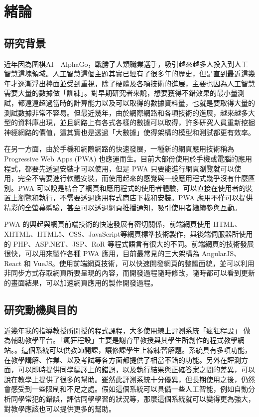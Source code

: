 \chapter{緒論}
\section{研究背景} 

近年因為圍棋AI—AlphaGo，戰勝了人類職業選手，吸引越來越多人投入到人工智慧這塊領域。人工智慧這個主題其實已經有了很多年的歷史，但是直到最近這幾年才逐漸浮出檯面並受到重視，除了硬體及各項技術的進展，主要也因為人工智慧需要大量的數據做「訓練」。對早期研究者來說，想要獲得不錯效果的最小量測試，都遠遠超過當時的計算能力以及可以取得的數據資料量，也就是要取得大量的測試數據非常不容易。但最近幾年，由於網際網路和各項技術的進展，越來越多大型的資料庫出現，並且網路上有各式各樣的數據可以取得，許多研究人員重新挖掘神經網路的價值，這其實也是透過「大數據」使得架構的模型和測試都更有效率。\cite{name1}

在另一方面，由於手機和網際網路的快速發展，一種新的網頁應用技術稱為 Progressive Web Apps (PWA) 也應運而生。目前大部份使用於手機或電腦的應用程式，都要先透過安裝才可以使用，但是 PWA 只要能進行網頁瀏覽就可以使用，完全不需要進行軟體安裝，而使用起來的感覺與一般應用程式幾乎沒有什麼區別。PWA 可以說是結合了網頁和應用程式的使用者體驗，可以直接在使用者的裝置上瀏覽和執行，不需要透過應用程式商店下載和安裝。PWA 應用不僅可以提供精彩的全螢幕體驗，甚至可以透過網頁推播通知，吸引使用者繼續參與互動\cite{name3}。

PWA 的興起與網頁前端技術的快速發展有密切關係，前端網頁使用 HTML、XHTML、HTML5、CSS、JavaScript等網頁標準技術製作，與後端伺服器所使用的 PHP、ASP.NET、JSP、RoR 等程式語言有很大的不同。前端網頁的技術發展很快，可以用來製作各種 PWA 應用，目前最常見的三大架構為 AngularJS、React 和 VueJS。使用前端網頁技術，可以快速開發網頁的整體面貌，並可以利用非同步方式存取網頁所要呈現的內容，而開發過程隨時修改，隨時都可以看到更新的畫面結果，可以加速網頁應用的製作開發過程。\cite{name2}

\section{研究動機與目的}

近幾年我的指導教授所開授的程式課程，大多使用線上評測系統「瘋狂程設」\cite{name4} 做為輔助教學平台。「瘋狂程設」主要是謝育平教授與其學生所創作的程式教學網站。\cite{name5}。這個系統可以供教師開課，讓修課學生上線練習解題。系統具有多項功能，在教學講解、作業、以及考試等各方面都提供了相當不錯的功能。另外在評測方面，可以即時提供同學編譯上的錯誤，以及執行結果與正確答案之間的差異，可以說在教學上提供了很多的幫助。雖然此評測系統十分優異，但長期使用之後，仍然會感受到一些限制和不足之處。假如這個系統可以具備一些人工智能，例如自動分析同學常犯的錯誤，評估同學學習的狀況等，那麼這個系統就可以變得更為強大，對教學應該也可以提供更多的幫助。


